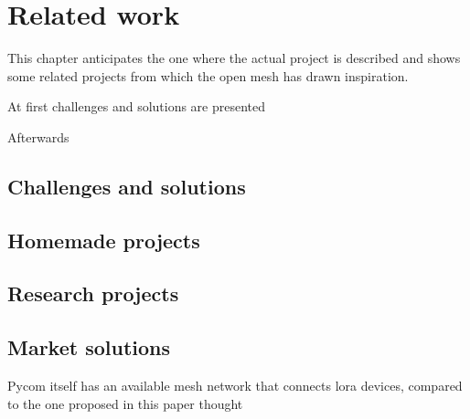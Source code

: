 

\chapter{Related work}\label{chapter:related_work}

	This chapter anticipates the one where the actual project is described and shows some related projects from which the open mesh has drawn inspiration.
	
	At first challenges and solutions are presented
	
	Afterwards 
	
	\section{Challenges and solutions}
		
	
		
	
	\section{Homemade projects}
	
		
	
	\section{Research projects}
	
		
	
	\section{Market solutions}
	
	
	
		Pycom itself has an available mesh network that connects lora devices, compared to the one proposed in this paper thought
